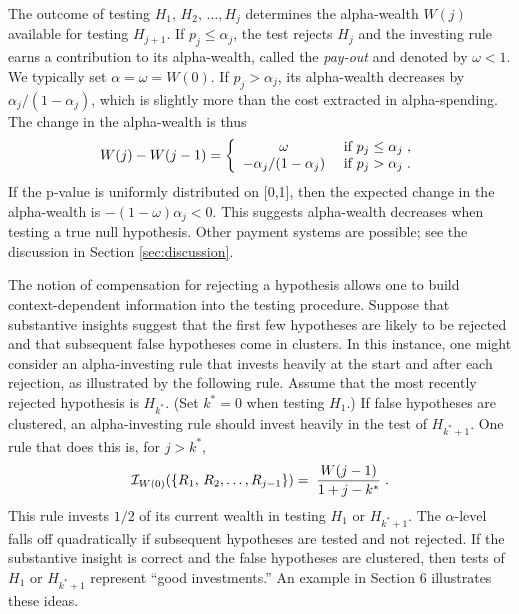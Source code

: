 \documentclass[12pt]{article}
\begin{document}
The outcome of testing $H_{1},\,H_{2},\,\ldots,H_{j}$ determines the alpha-wealth
$W(j)$ available for testing $H_{j+1}$.  If $p_j \le \alpha_j$, the test rejects
$H_j$ and the investing rule earns a contribution to its alpha-wealth, 
called the {\em pay-out} and denoted by $\omega < 1$. We typically set $\alpha = \omega = W(0)$.  If $p_j > \alpha_j$, its alpha-wealth decreases by $\alpha_j/(1-\alpha_j)$, which is slightly more than 
 the cost extracted in alpha-spending.  The change in the alpha-wealth is thus
\begin{equation}
  W(j) - W(j-1) =
   \left\{ \begin{array}{cc}
                \omega                            & \mbox{ if } p_j \le \alpha_j  \;,\cr
                 -\alpha_j/(1-\alpha_{j})     & \mbox{ if } p_j > \alpha_j   \;.
           \end{array} \right.
\label{eq:Wm}
\end{equation}
If the p-value is uniformly distributed on [0,1], then the expected
 change in the alpha-wealth is $-(1 - \omega) \alpha_j < 0$.  This
 suggests alpha-wealth decreases when testing a true null hypothesis.
 Other payment systems are possible; see the discussion in Section
 \ref{sec:discussion}.

 
 The notion of compensation for rejecting a hypothesis
  allows one to build context-dependent information into
 the testing procedure.  Suppose that substantive insights suggest
 that the first few hypotheses are likely to be rejected and that
 subsequent false hypotheses come in clusters.  In this instance, one might
 consider an alpha-investing rule that invests heavily at the
 start and after each rejection, as illustrated by the following rule.
  Assume that the most recently rejected hypothesis is $H_{k^{*}}$. 
  (Set $k^{*}=0$ when testing $H_1$.)
  If false hypotheses are clustered, an alpha-investing rule should
 invest heavily in the test of $H_{k^{*}+1}$.
  One rule that does this is, for $j>k^{*}$,
\begin{equation}
  {\cal I}_{W(0)}(\{R_1,\, R_2, \ldots,R_{j-1}\})
     =  \;\frac{W(j-1)}{1 + j - k^{*}} \;.
\label{eq:I-sqr}
\end{equation}
This rule invests $1/2$ of its current wealth in testing $H_1$ or $H_{k^{*}+1}$.  The
 $\alpha$-level falls off quadratically if
 subsequent hypotheses are tested and not rejected. If the
 substantive insight is correct and the false hypotheses are
 clustered, then tests of $H_1$ or $H_{k^{*}+1}$ represent ``good
 investments.''  An example in Section 6 illustrates these ideas.
\end{document}
